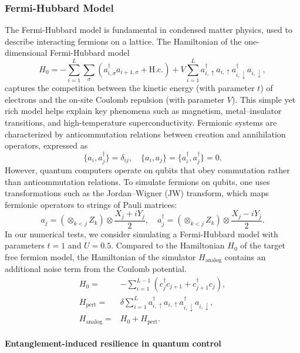 \documentclass[12pt]{article}
\begin{document}
\subsubsection{{Fermi-Hubbard Model}}
The Fermi-Hubbard model is fundamental in condensed matter physics, used to describe interacting fermions on a lattice. The Hamiltonian of the one-dimensional Fermi-Hubbard model 
\begin{equation}
        H_0=-\sum_{i=1}^L\sum_{\sigma}(a_{i,\sigma}^\dagger a_{i+1,\sigma}+\text{H.c.})+V\sum_{i=1}^La_{i,\uparrow}^\dagger a_{i,\uparrow}a_{i,\downarrow}^\dagger a_{i,\downarrow},
\end{equation}
captures the competition between the kinetic energy (with parameter $t$) of electrons and the on-site Coulomb repulsion (with parameter $V$). This simple yet rich model helps explain key phenomena such as magnetism, metal--insulator transitions, and high-temperature superconductivity. Fermionic systems are characterized by anticommutation relations between creation and annihilation operators, expressed as
\begin{equation}
    \{a_i,a_j^\dagger\}=\delta_{ij},\quad \{a_i,a_j\}=\{a_i^\dagger,a_j^\dagger\}=0.
\end{equation}
However, quantum computers operate on qubits that obey commutation rather than anticommutation relations. To simulate fermions on qubits, one uses transformations such as the Jordan--Wigner (JW) transform, which maps fermionic operators to strings of Pauli matrices:
\begin{equation}
    a_j=(\otimes_{k<j}Z_k)\otimes\dfrac{X_j+iY_j}2,\quad a_j^\dagger=(\otimes_{k<j}Z_k)\otimes\dfrac{X_j-iY_j}2.
\end{equation}
In our numerical tests, we consider simulating a Fermi-Hubbard model with parameters $t=1$ and $U=0.5$. Compared to the Hamiltonian $H_0$ of the target free fermion model, the Hamiltonian of the simulator $H_{\text{analog}}$ contains an additional noise term from the Coulomb potential.
\begin{align}
    H_0=&-\sum_{i=1}^{L-1}(c_j^{\dagger}c_{j+1}+c_{j+1}^\dagger c_j),\\
    H_{\text{pert}}=&\delta\sum_{i=1}^La^\dagger_{i, \uparrow} a_{i, \uparrow}
                         a^\dagger_{i, \downarrow} a_{i, \downarrow},\\
    H_{\text{analog}}=&H_0+H_{\text{pert}}.
\end{align}




\paragraph*{Entanglement-induced resilience in quantum control}
\end{document}
